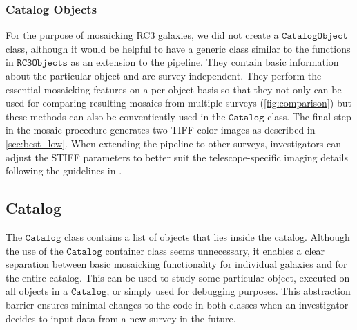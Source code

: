 \documentclass[5p]{elsarticle}
\begin{document}
	\subsubsection{Catalog Objects}
	For the purpose of mosaicking RC3 galaxies, we did not create a $\texttt{CatalogObject}$ class, although it would be helpful to have a generic class similar to the functions in $\texttt{RC3Objects}$ as an extension to the pipeline. They contain basic information about the particular object and are survey-independent. They perform the essential mosaicking features on a per-object basis so that they not only can be used for comparing resulting mosaics from multiple surveys (\autoref{fig:comparison}) but these methods can also be conventiently used in the $\texttt{Catalog}$ class. The final step in the mosaic procedure generates two TIFF color images as described in \autoref{sec:best_low}.  When extending the pipeline to other surveys, investigators can adjust the STIFF parameters to better suit the telescope-specific imaging details following the guidelines in \citealp{stiff}.
    \subsection{Catalog}
	The $\texttt{Catalog}$ class contains a list of objects that lies inside the catalog. Although the use of the $\texttt{Catalog}$ container class seems unnecessary, it enables a clear separation between basic mosaicking functionality for individual galaxies and for the entire catalog. This can be used to study some particular object, executed on all objects in a $\texttt{Catalog}$, or simply used for debugging purposes. This abstraction barrier ensures minimal changes to the code in both classes when an investigator decides to input data from a new survey in the future.
\end{document}
